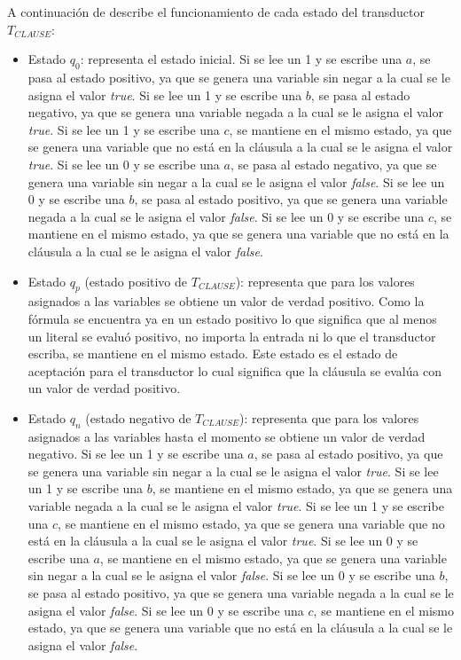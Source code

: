 \documentclass[12pt]{article}
\newcommand{\true}{\textit{true}}
\newcommand{\false}{\textit{false}}
\begin{document}
A continuación de describe el funcionamiento de cada estado del transductor $T_{CLAUSE}$:
\begin{itemize}
    \item Estado $q_0$: representa el estado inicial.
          Si se lee un 1 y se escribe una $a$, se pasa al estado positivo, ya que se genera una variable sin negar a la cual se le asigna el valor \true{}.  
          Si se lee un 1 y se escribe una $b$, se pasa al estado negativo, ya que se genera una variable negada a la cual se le asigna el valor \true{}.  
          Si se lee un 1 y se escribe una $c$, se mantiene en el mismo estado, ya que se genera una variable que no está en la cláusula a la cual se le asigna el valor \true{}.  
          Si se lee un 0 y se escribe una $a$, se pasa al estado negativo, ya que se genera una variable sin negar a la cual se le asigna el valor \false{}.  
          Si se lee un 0 y se escribe una $b$, se pasa al estado positivo, ya que se genera una variable negada a la cual se le asigna el valor \false{}.  
          Si se lee un 0 y se escribe una $c$, se mantiene en el mismo estado, ya que se genera una variable que no está en la cláusula a la cual se le asigna el valor \false{}.
          
    \item Estado $q_p$ (estado positivo de $T_{CLAUSE}$): representa que para los valores asignados a las variables se obtiene un valor de verdad positivo.
          Como la fórmula se encuentra ya en un estado positivo lo que significa que al menos un literal se evaluó positivo, no importa la entrada ni lo que el transductor escriba, 
          se mantiene en el mismo estado. Este estado es el estado de aceptación para el transductor lo cual significa que la cláusula se evalúa con un valor de verdad positivo.
          
    \item Estado $q_n$ (estado negativo de $T_{CLAUSE}$): representa que para los valores asignados a las variables hasta el momento se obtiene un valor de verdad negativo.
          Si se lee  un 1 y se escribe una $a$, se pasa al estado positivo, ya que se genera una variable sin negar a la cual se le asigna el valor \true{}.
          Si se lee  un 1 y se escribe una $b$, se mantiene en el mismo estado, ya que se genera una variable negada a la cual se le asigna el valor \true{}.
          Si se lee  un 1 y se escribe una $c$, se mantiene en el mismo estado, ya que se genera una variable que no está en la cláusula a la cual se le asigna el valor \true{}.
          Si se lee  un 0 y se escribe una $a$, se mantiene en el mismo estado, ya que se genera una variable sin negar a la cual se le asigna el valor \false{}.
          Si se lee  un 0 y se escribe una $b$, se pasa al estado positivo, ya que se genera una variable negada a la cual se le asigna el valor \false{}.
          Si se lee  un 0 y se escribe una $c$, se mantiene en el mismo estado, ya que se genera una variable que no está en la cláusula a la cual se le asigna el valor \false{}.
          
\end{itemize}
\end{document}
